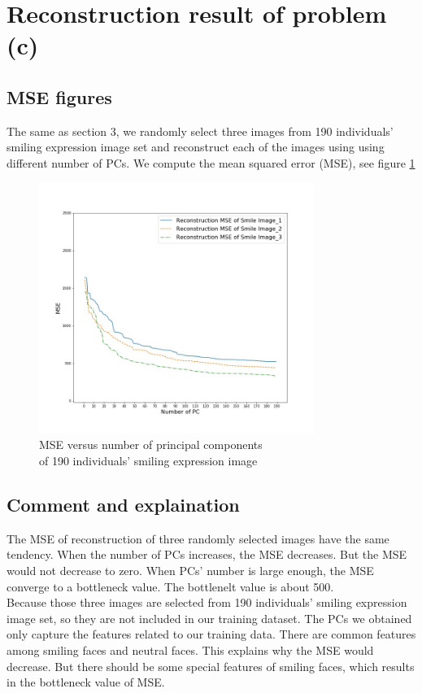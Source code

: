 \documentclass{article}
\begin{document}
\newpage
\section{Reconstruction result of problem (c)}

\subsection{MSE figures}
The same as section 3, we randomly select three images from 190 individuals’ smiling expression image set
and reconstruct each of the images using using different number of PCs. We compute the mean squared error (MSE), see figure
\ref{fig:fig3}
\begin{figure}[h]
  \centering
  \includegraphics[width=0.8\textwidth]{../image/mse_smile.jpg}
  \caption{MSE versus number of principal components\\ of 190 individuals’ smiling expression image}
  \label{fig:fig3}
\end{figure}

\subsection{Comment and explaination}
The MSE of reconstruction of three randomly selected images have the same tendency. When the number of PCs
increases, the MSE decreases. But the MSE would not decrease to zero. When PCs' number is large enough, the
MSE converge to a bottleneck value. The bottlenelt value is about 500.\\

Because those three images are selected from 190 individuals’ smiling expression image set, so they are not
included in our training dataset. The PCs we obtained only capture the features related to our training data.
There are common features among smiling faces and neutral faces. This explains why the MSE would decrease. But
there should be some special features of smiling faces, which results in the bottleneck value of MSE.
\end{document}

